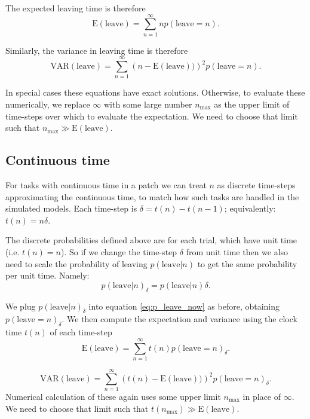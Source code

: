 \documentclass[11pt,a4paper]{article}
\begin{document}
The expected leaving time is therefore
\begin{equation}\label{eq:E_leave_discrete}
\mathrm{E(leave)}  = \sum_{n=1}^{\infty} n p(\mathrm{leave} = n).
\end{equation} 

Similarly, the variance in leaving time is therefore
\begin{equation}\label{eq:VAR_leave_discrete}
\mathrm{VAR(leave)}  = \sum_{n=1}^{\infty} \left(n - \mathrm{E(leave)})\right)^2 p(\mathrm{leave} = n).
\end{equation} 

In special cases these equations have exact solutions. Otherwise, to evaluate these numerically, we replace $\infty$ with some large number $n_{\textrm{max}}$ as the upper limit of time-steps over which to evaluate the expectation. We need to choose that limit such that $n_{\textrm{max}} \gg \mathrm{E(leave)}$. 

\subsection{Continuous time} \label{section:continuous}
For tasks with continuous time in a patch we can treat $n$ as discrete time-steps approximating the continuous time, to match how such tasks are handled in the simulated models. Each time-step is $\delta  = t(n) - t(n-1)$; equivalently: $t(n) = n \delta$.

The discrete probabilities defined above are for each trial, which have unit time (i.e. $t(n) = n$). So if we change the time-step $\delta$ from unit time then we also need to scale the probability of leaving $p(\mathrm{leave}|n)$ to get the same probability per unit time. Namely:
\begin{equation}\label{eq:p_leave_cont}
p(\mathrm{leave}|n)_\delta  = p(\mathrm{leave}|n) \delta.
\end{equation} 

We plug $p(\mathrm{leave}|n)_\delta$ into equation \ref{eq:p_leave_now} as before, obtaining $p(\mathrm{leave} = n)_\delta$. We then compute the expectation and variance using the clock time $t(n)$ of each time-step
\begin{equation}\label{eq:E_leave_cont}
\mathrm{E(leave)}  = \sum_{n=1}^{\infty} t(n)p(\mathrm{leave} = n)_\delta.
\end{equation} 

\begin{equation}\label{eq:VAR_leave_cont}
\mathrm{VAR(leave)}  = \sum_{n=1}^{\infty} \left(t(n) - \mathrm{E(leave)})\right)^2 p(\mathrm{leave} = n)_\delta.
\end{equation} 
Numerical calculation of these again uses some upper limit $n_{\textrm{max}}$ in place of $\infty$. We need to choose that limit such that $t(n_{\textrm{max}}) \gg \mathrm{E(leave)}$. 
\end{document}
